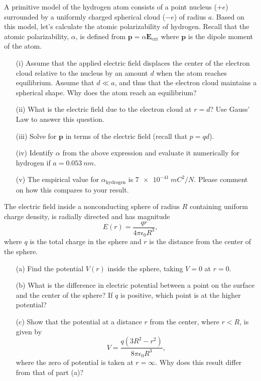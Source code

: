 \documentclass[12pt,letterpaper,boxed,cm]{hmcpset}
\newcommand{\f}[2]{\frac{#1}{#2}}
\begin{document}

\begin{problem}[SUP11]
 A primitive model of the hydrogen atom consists of a point nucleus ($+e$) surrounded by a uniformly charged spherical cloud ($-e$) of radius $a$. Based on this model, let's calculate the atomic polarizability of hydrogen. Recall that the atomic polarizability, $\alpha$, is defined from $\mathbf{p} = \alpha\mathbf{E}_{\text{ext}}$ where $\mathbf{p}$ is the dipole moment of the atom.
\begin{enumerate}
	\item[(i)] Assume that the applied electric field displaces the center of the electron cloud relative to the nucleus by an amount $d$ when the atom reaches equilibrium. Assume that $d \ll a$, and thus that the electron cloud maintains a spherical shape. Why does the atom reach an equilibrium?
	\item[(ii)] What is the electric field due to the electron cloud at $r = d$? Use Gauss' Law to answer this question.
	\item[(iii)] Solve for $\mathbf{p}$ in terms of the electric field (recall that $p = qd$).
	\item[(iv)] Identify $\alpha$ from the above expression and evaluate it numerically for hydrogen if $a = \SI{0.053}{nm}$.
	\item[(v)] The empirical value for $\alpha_{\text{hydrogen}}$ is $\SI{7e-41}{mC^2/N}$. Please comment on how this compares to your result.
\end{enumerate}
\end{problem}
\begin{solution}
\end{solution}
\newpage

\begin{problem}[SUP12]
	The electric field inside a nonconducting sphere of radius $R$ containing uniform charge density, is radially directed and has magnitude
	\[
		E(r) = \f{qr}{4\pi\epsilon_0R^3},
	\]	
	where $q$ is the total charge in the sphere and $r$ is the distance from the
	center of the sphere. 
	\begin{enumerate}
		\item[(a)] Find the potential $V(r)$ inside the sphere, taking $V = 0$ at $r = 0$.
		\item[(b)] What is the difference in electric potential between a point on the surface and the center of the sphere? If $q$ is positive, which point is at the higher potential?
		\item[(c)] Show that the potential at a distance $r$ from the center, where $r <R$, is given by
		\[
			V = \f{q(3R^2-r^2)}{8\pi\epsilon_0R^3},
		\]
		where the zero of potential is taken at $r = \infty$. Why does this result differ from that of part (a)?
	\end{enumerate}
\end{problem}
\begin{solution}
\end{solution}
\end{document}
